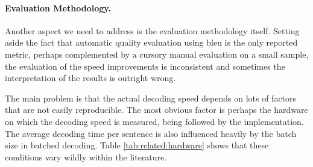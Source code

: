 \paragraph{Evaluation Methodology.} Another aspect we need to address is the
evaluation methodology itself. Setting aside the fact that automatic quality
evaluation using \acs{bleu} is the only reported metric, perhaps complemented
by a cursory manual evaluation on a small sample, the evaluation of the speed
improvements is inconsistent and sometimes the interpretation of the results is
outright wrong.

The main problem is that the actual decoding speed depends on lots of factors
that are not easily reproducible. The most obvious factor is perhaps the
hardware on which the decoding speed is measured, being followed by the
implementation. The average decoding time per sentence is also influenced
heavily by the batch size in batched decoding. Table \ref{tab:related:hardware}
shows that these conditions vary wildly within the literature.


